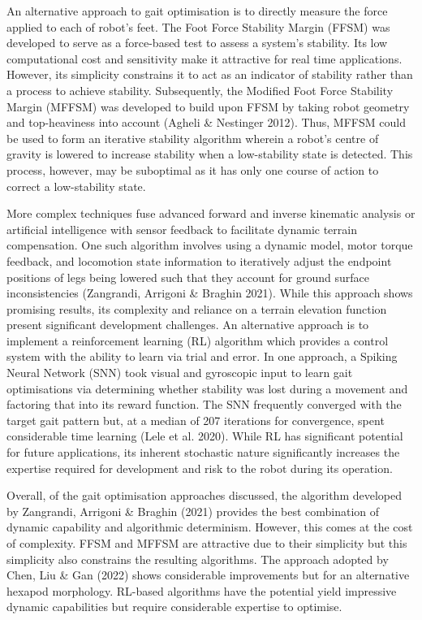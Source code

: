 An alternative approach to gait optimisation is to directly measure the force applied to each of robot's feet. The Foot Force Stability Margin (FFSM) was developed to serve as a force-based test to assess a system's stability. Its low computational cost and sensitivity make it attractive for real time applications. However, its simplicity constrains it to act as an indicator of stability rather than a process to achieve stability. Subsequently, the Modified Foot Force Stability Margin (MFFSM) was developed to build upon FFSM by taking robot geometry and top-heaviness into account (Agheli \& Nestinger 2012). Thus, MFFSM could be used to form an iterative stability algorithm wherein a robot's centre of gravity is lowered to increase stability when a low-stability state is detected. This process, however, may be suboptimal as it has only one course of action to correct a low-stability state.

More complex techniques fuse advanced forward and inverse kinematic analysis or artificial intelligence with sensor feedback to facilitate dynamic terrain compensation. One such algorithm involves using a dynamic model, motor torque feedback, and locomotion state information to iteratively adjust the endpoint positions of legs being lowered such that they account for ground surface inconsistencies (Zangrandi, Arrigoni \& Braghin 2021). While this approach shows promising results, its complexity and reliance on a terrain elevation function present significant development challenges. An alternative approach is to implement a reinforcement learning (RL) algorithm which provides a control system with the ability to learn via trial and error. In one approach, a Spiking Neural Network (SNN) took visual and gyroscopic input to learn gait optimisations via determining whether stability was lost during a movement and factoring that into its reward function. The SNN frequently converged with the target gait pattern but, at a median of 207 iterations for convergence, spent considerable time learning (Lele et al. 2020). While RL has significant potential for future applications, its inherent stochastic nature significantly increases the expertise required for development and risk to the robot during its operation.

Overall, of the gait optimisation approaches discussed, the algorithm developed by Zangrandi, Arrigoni \& Braghin (2021) provides the best combination of dynamic capability and algorithmic determinism. However, this comes at the cost of complexity. FFSM and MFFSM are attractive due to their simplicity but this simplicity also constrains the resulting algorithms. The approach adopted by Chen, Liu \& Gan (2022) shows considerable improvements but for an alternative hexapod morphology. RL-based algorithms have the potential yield impressive dynamic capabilities but require considerable expertise to optimise.

